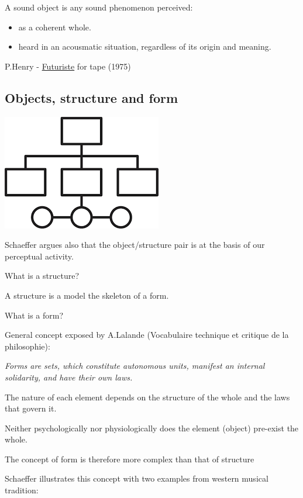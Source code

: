 A sound object is any sound phenomenon perceived:

\begin{itemize}
\tightlist
\item as a coherent whole.
\item heard in an acousmatic situation, regardless of its origin and meaning.
\end{itemize}

P.Henry - \href{https://github.com/musicaecodice/EMC/blob/main/3_fixed/suoni/henry.mp3}{Futuriste} for tape (1975)

\subsection{Objects, structure and form }\label{objects-structure-and-form}

\begin{center}
\includegraphics[scale=0.3]{../img/struc.png}
\end{center}

Schaeffer argues also that the object/structure pair is at the basis of our perceptual activity.

What is a structure?

A structure is a model the skeleton of a form.

What is a form?

General concept exposed by A.Lalande (Vocabulaire technique et critique de la philosophie):

\textit{Forms are sets, which constitute autonomous units, manifest an internal solidarity, and have their own laws.}

The nature of each element depends on the structure of the whole and the laws that govern it.

Neither psychologically nor physiologically does the element (object) pre-exist the whole.

The concept of form is therefore more complex than that of structure

Schaeffer illustrates this concept with two examples from western musical tradition:

